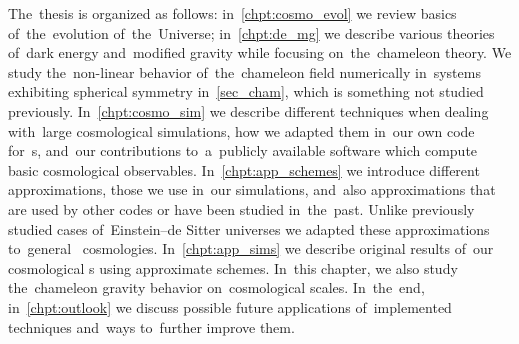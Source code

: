 The~thesis is organized as follows: in~\autoref{chpt:cosmo_evol} we review basics of~the~evolution of~the~Universe; in~\autoref{chpt:de_mg} we describe various theories of~dark energy and~modified gravity while focusing on~the~chameleon theory. We study the~non-linear behavior of~the~chameleon field numerically in~systems exhibiting spherical symmetry in~\autoref{sec_cham}, which is something not studied previously. In~\autoref{chpt:cosmo_sim} we describe different techniques when dealing with~large cosmological simulations, how we adapted them in~our own code for~\nbodysim s, and~our contributions to~a~publicly available software  which compute basic cosmological observables. In~\autoref{chpt:app_schemes} we introduce different approximations, those we use in~our simulations, and~also approximations that are used by other codes or have been studied in~the~past. Unlike previously studied cases of~Einstein--de Sitter universes we adapted these approximations to~general \LCDM\ cosmologies. In~\autoref{chpt:app_sims} we describe original results of~our cosmological \nbodysim s using approximate schemes. In~this chapter, we also study the~chameleon gravity behavior on~cosmological scales. %
In~the~end, in~\autoref{chpt:outlook} we discuss possible future applications of~implemented techniques and~ways to~further improve them.
